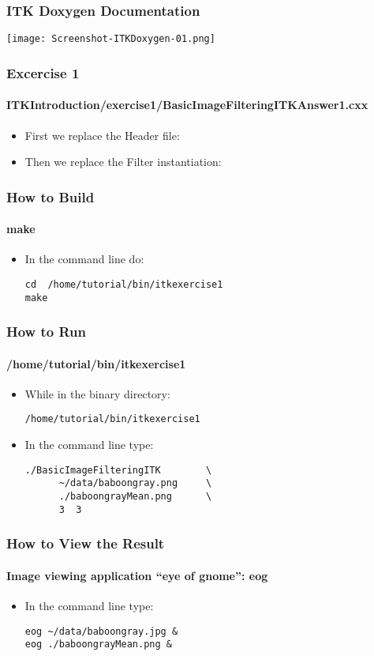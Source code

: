 \begin{frame}[fragile]
\frametitle{ITK Doxygen Documentation}
\begin{center}
  \texttt{[image: Screenshot-ITKDoxygen-01.png]}
\end{center}
\end{frame}

\begin{frame}
\frametitle{Excercise 1}
\framesubtitle{ITKIntroduction/exercise1/BasicImageFilteringITKAnswer1.cxx}
\begin{itemize}
\item First we replace the Header file:
\pause
\item Then we replace the Filter instantiation:
\end{itemize}
\end{frame}

\begin{frame}[fragile]
\frametitle{How to Build}
\framesubtitle{make}
\begin{itemize}
\item In the command line do:
\begin{verbatim}
cd  /home/tutorial/bin/itkexercise1
make
\end{verbatim}
\end{itemize}
\end{frame}

\begin{frame}[fragile]
\frametitle{How to Run}
\framesubtitle{/home/tutorial/bin/itkexercise1}
\begin{itemize}
\item While in the binary directory:
\begin{verbatim}
/home/tutorial/bin/itkexercise1
\end{verbatim}
\item In the command line type:
\begin{verbatim}
./BasicImageFilteringITK        \
      ~/data/baboongray.png     \
      ./baboongrayMean.png      \
      3  3
\end{verbatim}
\end{itemize}
\end{frame}

\begin{frame}[fragile]
\frametitle{How to View the Result}
\framesubtitle{Image viewing application ``eye of gnome'': eog}
\begin{itemize}
\item In the command line type:
\begin{verbatim}
eog ~/data/baboongray.jpg &
eog ./baboongrayMean.png &
\end{verbatim}
\end{itemize}
\end{frame}

